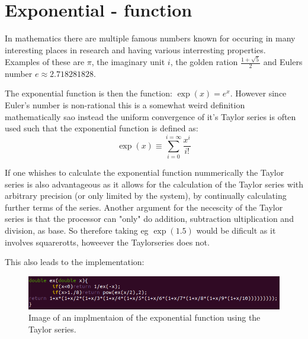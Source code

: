 \documentclass{article}
\begin{document}
\section*{Exponential - function}

 

In mathematics there are multiple famous numbers known for occuring in many interesting places in research and having various interresting properties. Examples of these are $\pi$, the imaginary unit $i$,  the golden ration $\frac{1+\sqrt{5}}{2}$ and Eulers number $e\approx2.718281828$.

 

The exponential function is then the function: $\exp(x)=e^x$. However since Euler's number is non-rational this is a somewhat weird definition mathematically sao instead the uniform convergence of it's Taylor series is often used such that the exponential function is defined as:
$$\exp(x)\equiv\sum_{i=0}^{i=\infty}\frac{x^i}{i!}$$


                             If one whishes to calculate the exponential function nummerically the Taylor series is also advantageous as it allows for the calculation of the Taylor series with arbitrary precision (or only limited by the system), by continually calculating further terms of the series.
			     Another argument for the necescity of the Taylor series is that the processor can "only" do addition, subtraction ultiplication and division, as base. So therefore taking eg $\exp(1.5)$ would be dificult as it involves squarerotts, howeever the Taylorseries does not. 
                            

                             This also leads to the implementation:

                             \begin{figure}[h]
                                                          \centering

                                                          \includegraphics[width=0.65\linewidth]{code.png}

                                                          \caption{Image of an implmentaion of the exponential function using the Taylor series.}\label{fig:code}

                             \end{figure}
\end{document}
